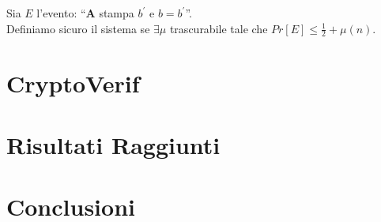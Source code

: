 \documentclass[a4paper,openright,twoside,12pt]{report}
\begin{document}
Sia $E$ l'evento: ``\textbf{A} stampa $b^{'}$ e $b=b^{'}$''.\\ 
Definiamo sicuro il sistema se $\exists \mu$ trascurabile tale che $Pr[E]\leq \frac{1}{2} + \mu(n)$.








\chapter{CryptoVerif}
\chapter{Risultati Raggiunti}
\chapter{Conclusioni}
\lhead[\fancyplain{}{\bfseries\thepage}]{\fancyplain{}{\bfseries\rightmark}}
	
		
\end{document}
